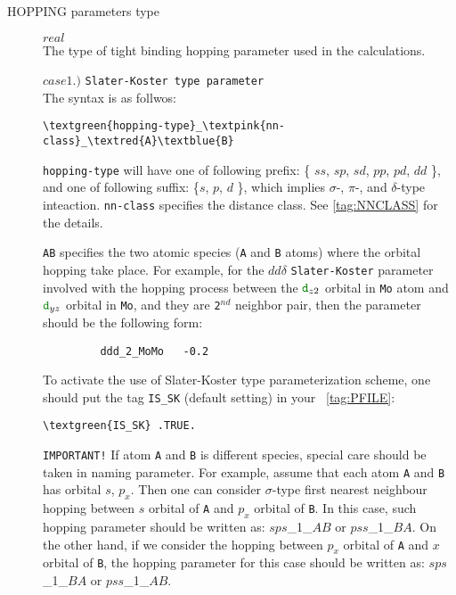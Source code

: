 \documentclass[a4paper,12pt]{scrartcl}
\makeatletter
\def\namedlabel#1#2{\begingroup
    #2%
    \def\@currentlabel{#2}%
    \phantomsection\label{#1}\endgroup
}
\newcommand{\textred}[1]{\textcolor{red!85!white}{\texttt{#1}}}
\newcommand{\textblue}[1]{\textcolor{blue!85!white}{\texttt{#1}}}
\newcommand{\textgreen}[1]{\textcolor{green!50!black}{\texttt{#1}}}
\newcommand{\textpink}[1]{\textcolor{red!60!yellow}{\texttt{#1}}}
\makeatother
\begin{document}
\begin{description}
    \item[\namedlabel{tag:hopping_type}{HOPPING parameters type}] $real$ \\
        The type of tight binding hopping parameter used in the calculations.

		\subitem $case 1.)$ \texttt{Slater-Koster type parameter} \\
		 The syntax is as follwos:
        \begin{Verbatim}[commandchars=\\\{\}]
         \textgreen{hopping-type}_\textpink{nn-class}_\textred{A}\textblue{B}
        \end{Verbatim}
		\texttt{hopping-type} will have one of following prefix: \{ $ss$, $sp$, $sd$, $pp$, 
		$pd$, $dd$ \}, and one of following suffix: \{$s$, $p$, $d$ \}, which implies
		$\sigma$-, $\pi$-, and $\delta$-type inteaction.
		\textpink{nn-class} specifies the distance class. See \ref{tag:NNCLASS} for the 
		details.

		\textred{A}\textblue{B} specifies the two atomic species (\textred{A} and \textblue{B} atoms) 
		where the orbital hopping take place. 
		For example, for the $dd\delta$ \texttt{Slater-Koster} parameter involved with 
		the hopping process between the $\textgreen{d}_{z2}$ orbital in \textred{Mo} atom 
		and $\textgreen{d}_{yz}$ orbital in \textblue{Mo}, 
		and they are \textpink{2$^{nd}$} neighbor pair, then the parameter should be the following form:
        \begin{verbatim}
         ddd_2_MoMo   -0.2
        \end{verbatim}
   
   		To activate the use of Slater-Koster type parameterization scheme,
		 one should put the tag \namedlabel{tag:IS_SK}{\textblue{IS\_SK}} (default setting) in your ~\ref{tag:PFILE}:
		\begin{Verbatim}[commandchars=\\\{\}]
	 \textgreen{IS_SK} .TRUE.
		\end{Verbatim}
     
        \texttt{IMPORTANT!} If atom \textred{A} and \textblue{B} is different species, special care should be taken in naming parameter.
        For example, assume that each atom \textred{A} and \textblue{B} has orbital $s$, $p_x$. 
        Then one can consider $\sigma$-type first nearest neighbour hopping between $s$ orbital of \textred{A} and $p_x$ orbital of \textblue{B}.
        In this case, such hopping parameter should be written as: $sps$\_1\_$AB$ or $pss$\_1\_$BA$.
        On the other hand, if we consider the hopping between $p_x$ orbital of \textred{A} and $x$ orbital of \textblue{B}, the hopping parameter for this case should be written as: $sps$\_1\_$BA$ or $pss$\_1\_$AB$.


\end{description}
\end{document}
